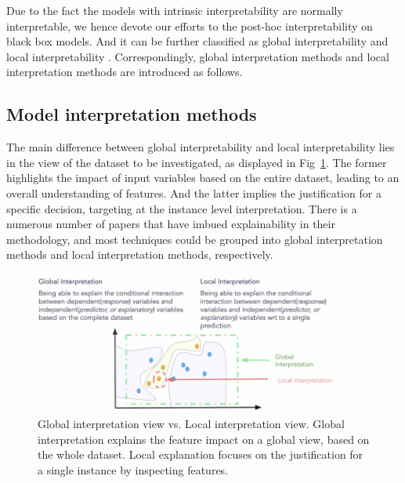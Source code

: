 Due to the fact the models with intrinsic interpretability are normally interpretable, we hence devote our efforts to the post-hoc interpretability on black box models. And it can be further classified as global interpretability and local interpretability \cite{du2018techniques}. Correspondingly, global interpretation methods and local interpretation methods are introduced as follows.



\subsection{Model interpretation methods}

The main difference between global interpretability and local interpretability lies in the view of the dataset to be investigated, as displayed in Fig~\ref{fig:global_local}. The former highlights the impact of input variables based on the entire dataset, leading to an overall understanding of features. And the latter implies the justification for a specific decision, targeting at the instance level interpretation. There is a numerous number of papers that have imbued explainability in their methodology, and most techniques could be grouped into global interpretation methods and local interpretation methods, respectively. 

\begin{figure}[H]
	\includegraphics[width=0.9\textwidth]{imgs/global_local.png}
	\caption{Global interpretation view vs. Local interpretation view. Global interpretation explains the feature impact on a global view, based on the whole dataset. Local explanation focuses on the justification for a single instance by inspecting features.}
	\label{fig:global_local}
\end{figure}

